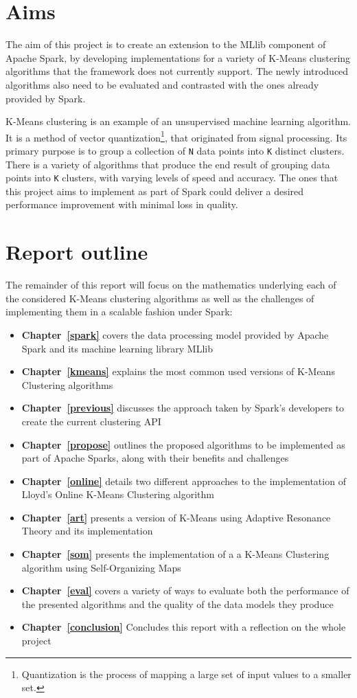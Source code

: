 \documentclass{l4proj}
\begin{document}
\section{Aims}

The aim of this project is to create an extension to the MLlib component of Apache Spark, by developing implementations for a variety of K-Means clustering algorithms that the framework does not currently support. The newly introduced algorithms also need to be evaluated and contrasted with the ones already provided by Spark.

K-Means clustering is an example of an unsupervised machine learning algorithm. It is a method of vector quantization\footnote{Quantization is the process of mapping a large set of input values to a smaller set.}, that originated from signal processing. Its primary purpose is to group a collection of \texttt{N} data points into \texttt{K} distinct clusters. There is a variety of algorithms that produce the end result of grouping data points into \texttt{K} clusters, with varying levels of speed and accuracy. The ones that this project aims to implement as part of Spark could deliver a desired performance improvement with minimal loss in quality.

\section{Report outline}

The remainder of this report will focus on the mathematics underlying each of the considered K-Means clustering algorithms as well as the challenges of implementing them in a scalable fashion under Spark:
\begin{itemize}
\item \textbf{Chapter~\ref{spark}} covers the data processing model provided by Apache Spark and its machine learning library MLlib
\item \textbf{Chapter~\ref{kmeans}} explains the most common used versions of K-Means Clustering algorithms
\item \textbf{Chapter~\ref{previous}} discusses the approach taken by Spark's developers to create the current clustering API
\item \textbf{Chapter~\ref{propose}} outlines the proposed algorithms to be implemented as part of Apache Sparks, along with their benefits and challenges
\item \textbf{Chapter~\ref{online}} details two different approaches to the implementation of Lloyd's Online K-Means Clustering algorithm
\item \textbf{Chapter~\ref{art}} presents a version of K-Means using Adaptive Resonance Theory and its implementation
\item \textbf{Chapter~\ref{som}} presents the implementation of a  a K-Means Clustering algorithm using Self-Organizing Maps
\item \textbf{Chapter~\ref{eval}} covers a variety of ways to evaluate both the performance of the presented algorithms and the quality of the data models they produce
\item \textbf{Chapter~\ref{conclusion}} Concludes this report with a reflection on the whole project
\end{itemize}
\end{document}
